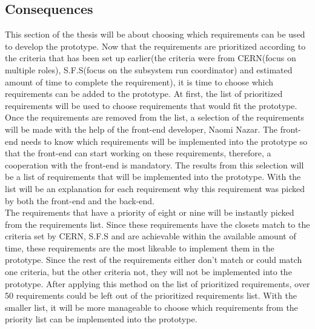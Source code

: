 \documentclass[paper=a4, fontsize=11pt,twoside]{scrartcl}	%
\begin{document}
\newpage
\subsection{Consequences}
This section of the thesis will be about choosing which requirements can be used to develop the prototype. Now that the requirements are prioritized according to the criteria that has been set up earlier(the criteria were from CERN(focus on multiple roles), S.F.S(focus on the subsystem run coordinator) and estimated amount of time to complete the requirement), it is time to choose which requirements can be added to the prototype. At first, the list of prioritized requirements will be used to choose requirements that would fit the prototype. Once the requirements are removed from the list, a selection of the requirements will be made with the help of the front-end developer, Naomi Nazar. The front-end needs to know which requirements will be implemented into the prototype so that the front-end can start working on these requirements, therefore, a cooperation with the front-end is mandatory. The results from this selection will be a list of requirements that will be implemented into the prototype. With the list will be an explanation for each requirement why this requirement was picked by both the front-end and the back-end. \\
The requirements that have a priority of eight or nine will be instantly picked from the requirements list. Since these requirements have the closets match to the criteria set by CERN, S.F.S and are achievable within the available amount of time, these requirements are the most likeable to implement them in the prototype. Since the rest of the requirements either don't match or could match one criteria, but the other criteria not, they will not be implemented into the prototype. After applying this method on the list of prioritized requirements, over 50 requirements could be left out of the prioritized requirements list. With the smaller list, it will be more manageable to choose which requirements from the priority list can be implemented into the prototype. \\
\end{document}
